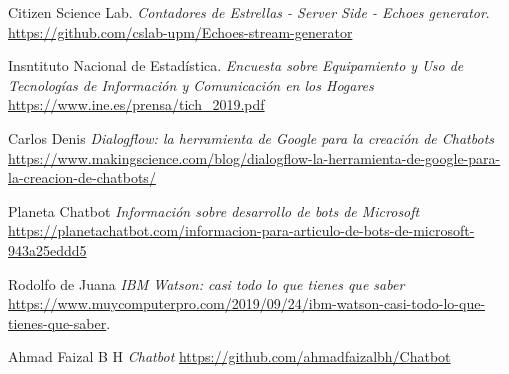 \begin{thebibliography}{99}




 Citizen Science Lab. \textit{Contadores de Estrellas - Server Side - Echoes generator}.
\url{https://github.com/cslab-upm/Echoes-stream-generator}

 Insntituto Nacional de Estadística. \textit{Encuesta sobre Equipamiento y Uso de Tecnologías de Información y
Comunicación en los Hogares}
\url{https://www.ine.es/prensa/tich_2019.pdf}

 Carlos Denis \textit{Dialogflow: la herramienta de Google para la creación de Chatbots} \url{https://www.makingscience.com/blog/dialogflow-la-herramienta-de-google-para-la-creacion-de-chatbots/}

 Planeta Chatbot \textit{Información sobre desarrollo de bots de Microsoft} \url{https://planetachatbot.com/informacion-para-articulo-de-bots-de-microsoft-943a25eddd5}

 Rodolfo de Juana \textit{IBM Watson: casi todo lo que tienes que saber} \url{https://www.muycomputerpro.com/2019/09/24/ibm-watson-casi-todo-lo-que-tienes-que-saber}.

 Ahmad Faizal B H \textit{Chatbot} \url{https://github.com/ahmadfaizalbh/Chatbot}

\end{thebibliography}
